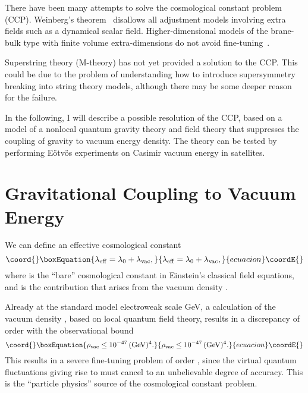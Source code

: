 \documentclass[a4paper,12pt]{article}
\begin{document}
There have been many attempts to solve the cosmological constant
problem (CCP). Weinberg's theorem~\cite{Weinberg} disallows all adjustment
models involving extra fields such as a dynamical scalar field.
Higher-dimensional models of the brane-bulk type with finite volume
extra-dimensions do not avoid fine-tuning~\cite{Cline}.

Superstring theory (M-theory) has not yet provided a solution to the
CCP. This could be due to the problem of understanding how to introduce
supersymmetry breaking into string theory models, although there may be
some deeper reason for the failure.

In the following, I will describe a possible resolution of
the CCP, based on a model of a nonlocal
quantum gravity theory and field theory that suppresses the coupling of
gravity to vacuum energy density. The theory can be tested by performing
E\"otv\"os experiments on Casimir vacuum energy in satellites.

\section{\bf Gravitational Coupling to Vacuum Energy}

We can define an effective cosmological constant
\begin{equation}\coord{}\boxEquation{
\lambda_{\rm eff}=\lambda_0+\lambda_{\rm vac},
}{
\lambda_{\rm eff}=\lambda_0+\lambda_{\rm vac},
}{ecuacion}\coordE{}\end{equation}
where \coordHE{} is the ``bare'' cosmological
constant in Einstein's classical field equations,
and \coordHE{} is the contribution that arises from the
vacuum density \coordHE{}.

Already at the standard model electroweak scale \coordHE{} GeV, a
calculation of the vacuum density \coordHE{}, based on local quantum field
theory, results in a discrepancy of order \coordHE{} with the observational
bound
\begin{equation}\coord{}\boxEquation{
\label{vacbound}
\rho_{\rm vac} \leq 10^{-47}\, ({\rm GeV})^4.
}{
\rho_{\rm vac} \leq 10^{-47}\, ({\rm GeV})^4.
}{ecuacion}\coordE{}\end{equation}
This results in a severe fine-tuning problem of order \coordHE{},
since the virtual quantum fluctuations giving rise to \coordHE{}
must cancel \coordHE{} to an unbelievable degree of accuracy.
This is the ``particle physics'' source of the cosmological
constant problem.
\end{document}
